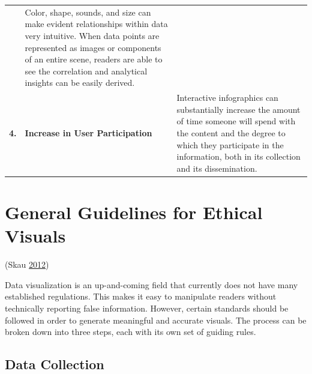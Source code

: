 \documentclass[]{book}
\begin{document}
\begin{longtable}[]{@{}lll@{}}
\begin{minipage}[t]{0.11\columnwidth}
\end{minipage} & \begin{minipage}[t]{0.76\columnwidth}\raggedright\strut
Color, shape, sounds, and size can make evident relationships within
data very intuitive. When data points are represented as images or
components of an entire scene, readers are able to see the correlation
and analytical insights can be easily derived.\strut
\end{minipage}\tabularnewline
\begin{minipage}[t]{0.05\columnwidth}\raggedright\strut
\textbf{4.}\strut
\end{minipage} & \begin{minipage}[t]{0.11\columnwidth}\raggedright\strut
\textbf{Increase in User Participation}\strut
\end{minipage} & \begin{minipage}[t]{0.76\columnwidth}\raggedright\strut
Interactive infographics can substantially increase the amount of time
someone will spend with the content and the degree to which they
participate in the information, both in its collection and its
dissemination.\strut
\end{minipage}\tabularnewline
\bottomrule
\end{longtable}

\section{General Guidelines for Ethical
Visuals}\label{general-guidelines-for-ethical-visuals}

(Skau \protect\hyperlink{ref-ethics_code}{2012})

Data visualization is an up-and-coming field that currently does not
have many established regulations. This makes it easy to manipulate
readers without technically reporting false information. However,
certain standards should be followed in order to generate meaningful and
accurate visuals. The process can be broken down into three steps, each
with its own set of guiding rules.

\subsection{Data Collection}\label{data-collection}
\end{document}
